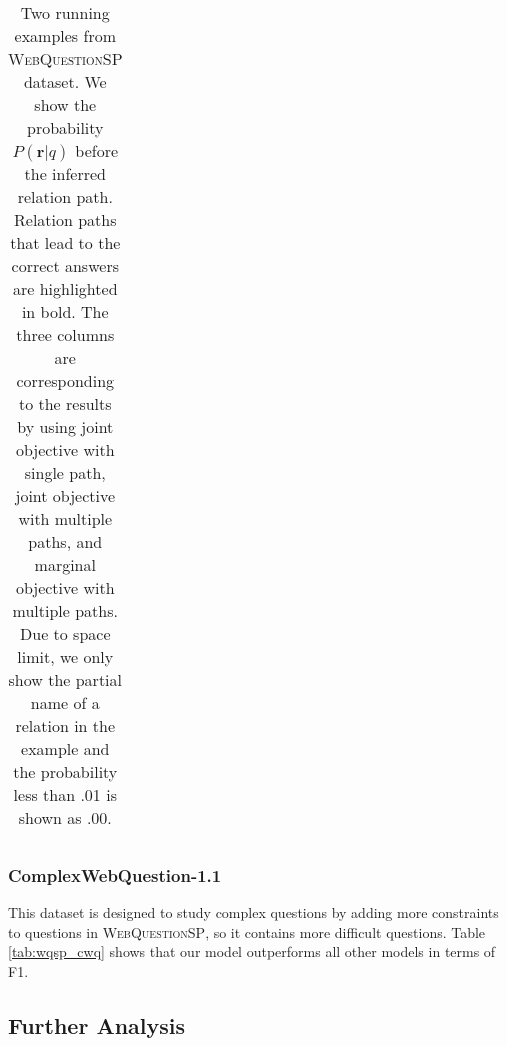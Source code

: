 \begin{table*}[t]
{\begin{tabular}{l|l|l}
\end{tabular}
}\caption{\fontsize{10}{12}\selectfont Two running examples from \textsc{WebQuestionSP} dataset. We show the probability $P(\mathbf{r}|q)$ before the inferred relation path. Relation paths that lead to the correct answers are highlighted in bold. The three columns are corresponding to the results by using joint objective with single path, joint objective with multiple paths, and marginal objective with multiple paths. Due to space limit, we only show the partial name of a relation in the example and the probability less than .01 is shown as .00.}\label{tab:case}
\end{table*}

\subsubsection{ComplexWebQuestion-1.1}

This dataset is designed to study complex questions by adding more constraints to questions in \textsc{WebQuestionSP}, so it contains more difficult questions.  Table \ref{tab:wqsp_cwq} shows that our model outperforms all other models in terms of F1. 


\subsection{Further Analysis}

\begin{table}[h]\centering
{}
\caption{\fontsize{10}{12}\selectfont We report F1 and standard deviation. \textsc{BEST} represents XXX.}\label{tab:wqsp_cwq_ablation}
\end{table}


